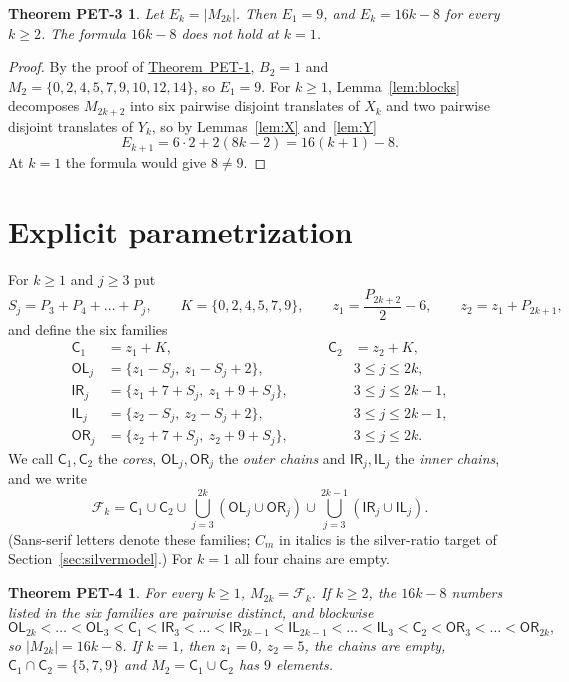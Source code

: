 \documentclass[11pt]{amsart}
\theoremstyle{definition}
\theoremstyle{remark}
\theoremstyle{plain}
\newtheorem*{thmPETthree}{Theorem PET-3}
\newtheorem*{thmPETfour}{Theorem PET-4}
\numberwithin{equation}{section}
\newcommand{\CC}{\mathsf{C}}
\newcommand{\OL}{\mathsf{OL}}
\newcommand{\OR}{\mathsf{OR}}
\newcommand{\IL}{\mathsf{IL}}
\newcommand{\IR}{\mathsf{IR}}
\newcommand{\Fam}{\mathcal{F}}
\newcommand{\PETone}{\hyperref[thm:pet1]{Theorem~PET-1}}
\begin{document}
\begin{thmPETthree}\label{thm:pet3}
Let $E_k=|M_{2k}|$. Then $E_1=9$, and $E_k=16k-8$ for every $k\ge2$. The formula $16k-8$ does not
hold at $k=1$.
\end{thmPETthree}

\begin{proof}
By the proof of \PETone, $B_2=1$ and $M_2=\{0,2,4,5,7,9,10,12,14\}$, so $E_1=9$. For $k\ge1$,
Lemma~\ref{lem:blocks} decomposes $M_{2k+2}$ into six pairwise disjoint translates of $X_k$ and two
pairwise disjoint translates of $Y_k$, so by Lemmas~\ref{lem:X} and~\ref{lem:Y}
\[
E_{k+1}=6\cdot2+2(8k-2)=16(k+1)-8 .
\]
At $k=1$ the formula would give $8\ne9$.
\end{proof}

\section{Explicit parametrization}\label{sec:pet4}

For $k\ge1$ and $j\ge3$ put
\[
S_j=P_3+P_4+\dots+P_j,\qquad K=\{0,2,4,5,7,9\},\qquad z_1=\frac{P_{2k+2}}{2}-6,\qquad
z_2=z_1+P_{2k+1},
\]
and define the six families
\[
\begin{aligned}
\CC_1&=z_1+K, &\qquad \CC_2&=z_2+K,\\
\OL_j&=\{z_1-S_j,\ z_1-S_j+2\}, && 3\le j\le 2k,\\
\IR_j&=\{z_1+7+S_j,\ z_1+9+S_j\}, && 3\le j\le 2k-1,\\
\IL_j&=\{z_2-S_j,\ z_2-S_j+2\}, && 3\le j\le 2k-1,\\
\OR_j&=\{z_2+7+S_j,\ z_2+9+S_j\}, && 3\le j\le 2k.
\end{aligned}
\]
We call $\CC_1,\CC_2$ the \emph{cores}, $\OL_j,\OR_j$ the \emph{outer chains} and $\IR_j,\IL_j$ the
\emph{inner chains}, and we write
\[
\Fam_k=\CC_1\cup\CC_2\cup\bigcup_{j=3}^{2k}(\OL_j\cup\OR_j)\cup\bigcup_{j=3}^{2k-1}(\IR_j\cup\IL_j).
\]
(Sans-serif letters denote these families; $C_m$ in italics is the silver-ratio target of
Section~\ref{sec:silvermodel}.) For $k=1$ all four chains are empty.

\begin{thmPETfour}\label{thm:pet4}
For every $k\ge1$, $M_{2k}=\Fam_k$. If $k\ge2$, the $16k-8$ numbers listed in the six families are
pairwise distinct, and blockwise
\[
\OL_{2k}<\dots<\OL_3<\CC_1<\IR_3<\dots<\IR_{2k-1}<\IL_{2k-1}<\dots<\IL_3<\CC_2<\OR_3<\dots<\OR_{2k},
\]
so $|M_{2k}|=16k-8$. If $k=1$, then $z_1=0$, $z_2=5$, the chains are empty,
$\CC_1\cap\CC_2=\{5,7,9\}$ and $M_2=\CC_1\cup\CC_2$ has $9$ elements.
\end{thmPETfour}
\end{document}
